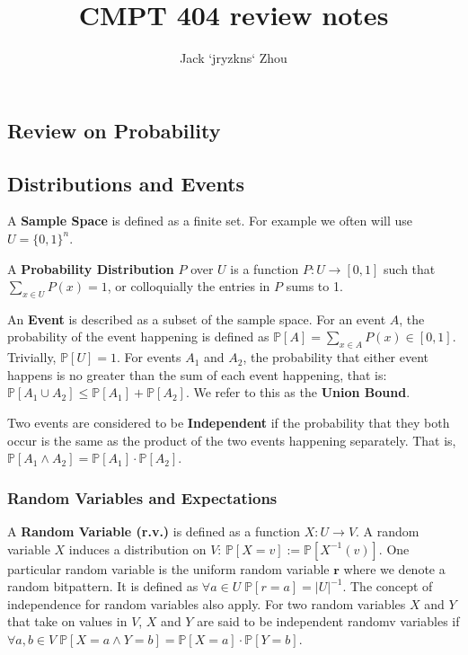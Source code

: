 \documentclass{article}
\title{CMPT 404 review notes}
\author{Jack `jryzkns` Zhou}
\date{}
\begin{document}
\maketitle

\begin{multicols}{2}


\section{Review on Probability}

\subsection{Distributions and Events}

A \textbf{Sample Space} is defined as a finite set. For example we often will use $U = \{0,1\}^n$.

A \textbf{Probability Distribution} $P$ over $U$ is a function $P: U \rightarrow [0,1]$ such that $\sum_{x \in U} P(x) = 1$, or colloquially the entries in $P$ sums to 1.

An \textbf{Event} is described as a subset of the sample space. For an event $A$, the probability of the event happening is defined as $\mathbb{P}[A] = \sum_{x \in A} P(x) \in [0,1]$. Trivially, $\mathbb{P}[U] = 1$. For events $A_1$ and $A_2$, the probability that either event happens is no greater than the sum of each event happening, that is: $\mathbb{P}[A_1 \cup A_2] \leq \mathbb{P}[A_1] + \mathbb{P}[A_2]$. We refer to this as the \textbf{Union Bound}. 

Two events are considered to be \textbf{Independent} if the probability that they both occur is the same as the product of the two events happening separately. That is, $\mathbb{P}[A_1 \wedge A_2] = \mathbb{P}[A_1]\cdot\mathbb{P}[A_2]$.

\subsubsection{Random Variables and Expectations}

A \textbf{Random Variable (r.v.)} is defined as a function $X: U \rightarrow V$. A random variable $X$ induces a distribution on $V$: $\mathbb{P}[X=v] := \mathbb{P}[X^{-1}(v)]$. One particular random variable is the uniform random variable $\mathbf{r}$ where we denote a random bitpattern. It is defined as $\forall a \in U \; \mathbb{P}[r = a] = |U|^{-1}$. The concept of independence for random variables also apply. For two random variables $X$ and $Y$ that take on values in $V$, $X$ and $Y$ are said to be independent randomv variables if $\forall a,b \in V \; \mathbb{P}[X = a \wedge Y = b] = \mathbb{P}[X = a] \cdot \mathbb{P}[Y = b]$.


\end{multicols}
\end{document}
